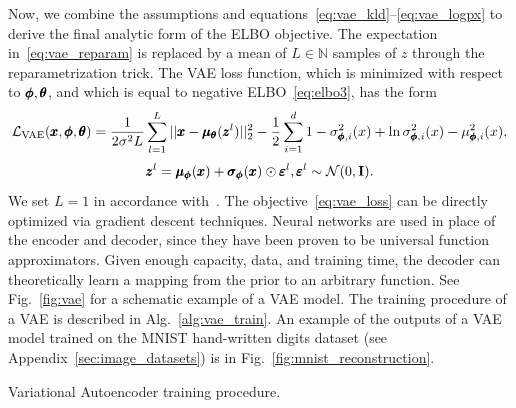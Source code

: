 Now, we combine the assumptions and equations~\eqref{eq:vae_kld}--\eqref{eq:vae_logpx} to derive the final analytic form of the ELBO objective. The expectation in~\eqref{eq:vae_reparam} is replaced by a mean of $L \in \mathbb{N}$ samples of $z$ through the reparametrization trick. The VAE loss function, which is minimized with respect to $\pmb{{\phi}}, \pmb{{\theta}}$, and which is equal to negative ELBO~\eqref{eq:elbo3}, has the form
\begin{equation} \label{eq:vae_loss}
\mathcal{L_{\text{VAE}}}(\pmb{{x}},\pmb{{\phi}},\pmb{{\theta}})=\frac{1}{2\sigma^2 L}\sum_{l=1}^{L}||\pmb{{x}}-\pmb{{\mu}}_{\pmb{{\theta}}}(\pmb{{z}}^{l})||_{2}^{2} - \frac{1}{2}\sum_{i=1}^{d} 1-\sigma_{\pmb{{\phi}},i}^{2}(x)+\ln\sigma_{\pmb{{\phi}},i}^{2}(x)-\mu_{\pmb{{\phi}},i}^{2}(x),
\end{equation}
\begin{equation} 
\pmb{{z}}^l=\pmb{{\mu}}_{\pmb{{\phi}}}(\pmb{{x}})+\pmb{{\sigma}}_{\pmb{{\phi}}}(\pmb{{x}}) \odot \pmb{{\varepsilon}}^l, \pmb{{\varepsilon}}^l \sim  \mathcal{N}(0,\mathbf{I}). \nonumber
\end{equation}
We set $L=1$ in accordance with~\cite{kingma2013vae}. The objective~\eqref{eq:vae_loss} can be directly optimized via gradient descent techniques. Neural networks are used in place of the encoder and decoder, since they have been proven to be universal function approximators. Given enough capacity, data, and training time, the decoder can theoretically learn a mapping from the prior to an arbitrary function. See Fig.~\ref{fig:vae} for a schematic example of a VAE model. The training procedure of a VAE is described in Alg.~\ref{alg:vae_train}. An example of the outputs of a VAE model trained on the MNIST hand-written digits dataset (see Appendix~\ref{sec:image_datasets}) is in Fig.~\ref{fig:mnist_reconstruction}.

\begin{algorithm}
\caption{Variational Autoencoder training procedure.}
\label{alg:vae_train}
\end{algorithm}

